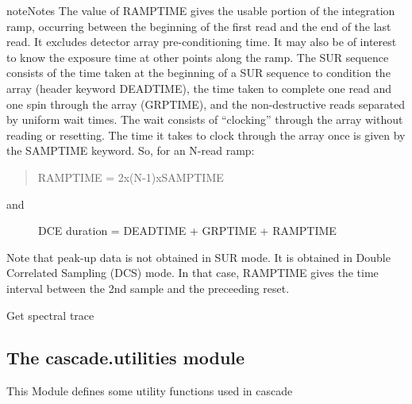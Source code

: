 \documentclass[a4paper,10pt,english]{sphinxmanual}
\begin{document}
\begin{fulllineitems}
\begin{fulllineitems}
\begin{sphinxadmonition}{note}{Notes}
The value of RAMPTIME gives the usable portion of the integration ramp,
occurring between the beginning of the first read and the end of the
last read. It excludes detector array pre-conditioning time.
It may also be of interest to know the exposure time at other points
along the ramp. The SUR sequence consists of the time taken at the
beginning of a SUR sequence to condition the array
(header keyword DEADTIME), the time taken to complete one read and
one spin through the array (GRPTIME), and the non-destructive reads
separated by uniform wait times. The wait consists of “clocking”
through the array without reading or resetting. The time it takes to
clock through the array once is given by the SAMPTIME keyword.
So, for an N-read ramp:
\begin{quote}

RAMPTIME = 2x(N-1)xSAMPTIME
\end{quote}
\begin{description}
\item[{and}] \leavevmode
DCE duration = DEADTIME + GRPTIME + RAMPTIME

\end{description}

Note that peak-up data is not obtained in SUR mode. It is obtained in
Double Correlated Sampling (DCS) mode. In that case, RAMPTIME gives the
time interval between the 2nd sample and the preceeding reset.
\end{sphinxadmonition}

\end{fulllineitems}


\begin{fulllineitems}
\label{\detokenize{cascade.instruments:cascade.instruments.instruments.SpitzerIRS.get_spectral_trace}}
Get spectral trace

\end{fulllineitems}


\end{fulllineitems}



\subsection{The cascade.utilities module}
\label{\detokenize{cascade.utilities:module-cascade.utilities.utilities}}\label{\detokenize{cascade.utilities:the-cascade-utilities-module}}\label{\detokenize{cascade.utilities::doc}}
This Module defines some utility functions used in cascade
\end{document}
